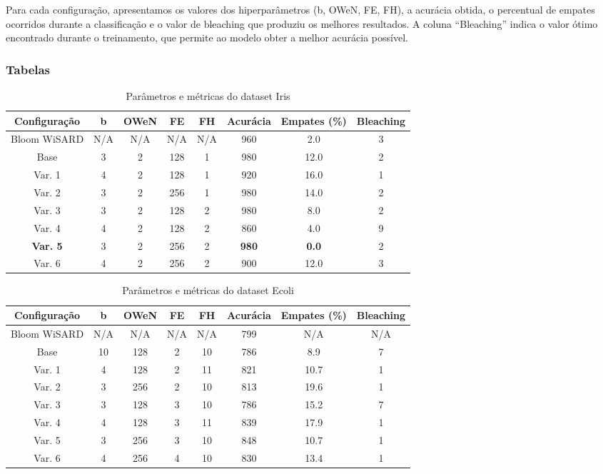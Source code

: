 \documentclass{article}
\begin{document}
Para cada configuração, apresentamos os valores dos hiperparâmetros (b, OWeN, FE, FH), a acurácia obtida, o percentual de empates ocorridos durante a classificação e o valor de bleaching que produziu os melhores resultados. A coluna ``Bleaching'' indica o valor ótimo encontrado durante o treinamento, que permite ao modelo obter a melhor acurácia possível.

\subsubsection{Tabelas}

{\small
\begin{table}[H]
\caption{Parâmetros e métricas do dataset Iris}
\begin{tabular}{|c|c|c|c|c|c|c|c|}
\hline
\textbf{Configuração} & \textbf{b} & \textbf{OWeN} & \textbf{FE} & \textbf{FH} & \textbf{Acurácia} & \textbf{Empates (\%)} & \textbf{Bleaching} \\
\hline
Bloom WiSARD & N/A & N/A & N/A & N/A & 960 & 2.0 & 3 \\
\hline
Base & 3 & 2 & 128 & 1 & 980 & 12.0 & 2 \\
\hline
Var. 1 & 4 & 2 & 128 & 1 & 920 & 16.0 & 1 \\
\hline
Var. 2 & 3 & 2 & 256 & 1 & 980 & 14.0 & 2 \\
\hline
Var. 3 & 3 & 2 & 128 & 2 & 980 & 8.0 & 2 \\
\hline
Var. 4 & 4 & 2 & 128 & 2 & 860 & 4.0 & 9 \\
\hline
\textbf{Var. 5} & 3 & 2 & 256 & 2 & \textbf{980} & \textbf{0.0} & 2 \\
\hline
Var. 6 & 4 & 2 & 256 & 2 & 900 & 12.0 & 3 \\
\hline
\end{tabular}
\end{table}

\begin{table}[H]
\caption{Parâmetros e métricas do dataset Ecoli}
\begin{tabular}{|c|c|c|c|c|c|c|c|}
\hline
\textbf{Configuração} & \textbf{b} & \textbf{OWeN} & \textbf{FE} & \textbf{FH} & \textbf{Acurácia} & \textbf{Empates (\%)} & \textbf{Bleaching} \\
\hline
Bloom WiSARD & N/A & N/A & N/A & N/A & 799 & N/A & N/A \\
\hline
Base & 10 & 128 & 2 & 10 & 786 & 8.9 & 7 \\
\hline
Var. 1 & 4 & 128 & 2 & 11 & 821 & 10.7 & 1 \\
\hline
Var. 2 & 3 & 256 & 2 & 10 & 813 & 19.6 & 1 \\
\hline
Var. 3 & 3 & 128 & 3 & 10 & 786 & 15.2 & 7 \\
\hline
Var. 4 & 4 & 128 & 3 & 11 & 839 & 17.9 & 1 \\
\hline
Var. 5 & 3 & 256 & 3 & 10 & 848 & 10.7 & 1 \\
\hline
Var. 6 & 4 & 256 & 4 & 10 & 830 & 13.4 & 1 \\
\hline
\end{tabular}
\end{table}

}
\end{document}
